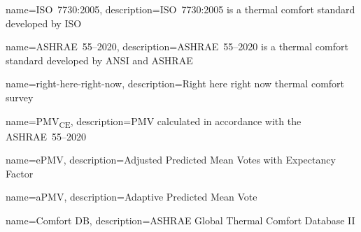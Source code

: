 \usepackage[nonumberlist,nogroupskip]{glossaries}


{
name={ISO~7730:2005},
description={ISO~7730:2005 is a thermal comfort standard developed by ISO}
}

{
name={ASHRAE~55--2020},
description={ASHRAE~55--2020 is a thermal comfort standard developed by ANSI and ASHRAE}
}

{
name={right-here-right-now},
description={Right here right now thermal comfort survey}
}

{
name={PMV\textsubscript{CE}},
description={PMV calculated in accordance with the ASHRAE~55--2020}
}

{
name={ePMV},
description={Adjusted Predicted Mean Votes with Expectancy Factor}
}

{
name={aPMV},
description={Adaptive Predicted Mean Vote}
}

{
name={Comfort DB},
description={ASHRAE Global Thermal Comfort Database II}
}

\makenoidxglossaries